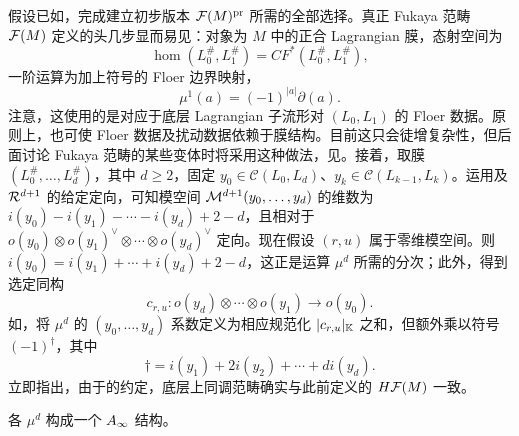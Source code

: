 假设已如，完成建立初步版本 $\mathcal F(M)^{\mathrm{pr}}$ 所需的全部选择。真正 Fukaya 范畴 $\mathcal F(M)$ 定义的头几步显而易见：对象为 $M$ 中的正合 Lagrangian 膜，态射空间为
\[
\operatorname{hom}(L_0^\#,L_1^\#)=CF^*(L_0^\#,L_1^\#),
\]
一阶运算为加上符号的 Floer 边界映射，
\[
\mu^1(a)=(-1)^{|a|}\partial(a).
\]
注意，这使用的是对应于底层 Lagrangian 子流形对 $(L_0,\allowbreak L_1)$ 的 Floer 数据。原则上，也可使 Floer 数据及扰动数据依赖于膜结构。目前这只会徒增复杂性，但后面讨论 Fukaya 范畴的某些变体时将采用这种做法，见。接着，取膜 $(L_0^\#,\allowbreak \ldots,\allowbreak L_d^\#)$，其中 $d\geq2$，固定 $y_0\in\mathcal C(L_0,\allowbreak L_d)$、$y_k\in\mathcal C(L_{k-1},\allowbreak L_k)$。运用及 $\mathcal R^{d+1}$ 的给定定向，可知模空间 $\mathcal M^{d+1}(y_0,\allowbreak \ldots,\allowbreak y_d)$ 的维数为 $i(y_0)-i(y_1)-\cdots-i(y_d)+2-d$，且相对于 $o(y_0)\otimes o(y_1)^\vee\otimes\cdots\otimes o(y_d)^\vee$ 定向。现在假设 $(r,\allowbreak u)$ 属于零维模空间。则 $i(y_0)=i(y_1)+\cdots+i(y_d)+2-d$，这正是运算 $\mu^d$ 所需的分次；此外，得到选定同构
\begin{equation}\label{eq:12.23}
c_{r,u}:o(y_d)\otimes\cdots\otimes o(y_1)\longrightarrow o(y_0).
\end{equation}
如，将 $\mu^d$ 的 $(y_0,\allowbreak \ldots,\allowbreak y_d)$ 系数定义为相应规范化 $|c_{r,\allowbreak u}|_{\mathbb K}$ 之和，但额外乘以符号 $(-1)^\dagger$，其中
\begin{equation}\label{eq:12.24}
\dagger=i(y_1)+2i(y_2)+\cdots+di(y_d).
\end{equation}
立即指出，由于的约定，底层上同调范畴确实与此前定义的 $H\mathcal F(M)$ 一致。
\begin{proposition}\label{st:12.3}
各 $\mu^d$ 构成一个 $A_\infty$ 结构。
\end{proposition}
